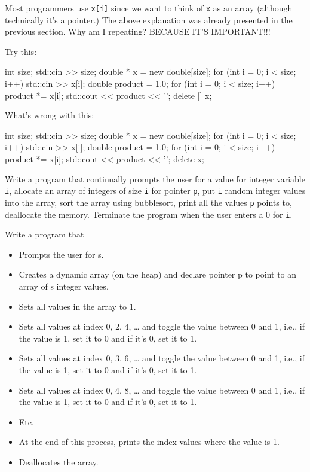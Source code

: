 Most programmers use \texttt{x[i]} since we want to think of \texttt{x}
as an array (although technically it's a pointer.) The
above explanation was already presented in the previous section. Why am
I repeating? BECAUSE IT'S IMPORTANT!!!

Try this:

\begin{consolethree}[escapeinside=||]
int size;
std::cin >> size;
double * x = new double[size];
for (int i = 0; i < size; i++)
{
    std::cin >> x[i];
}
double product = 1.0;
for (int i = 0; i < size; i++)
{
    product *= x[i];
    std::cout << product << '\n';
}
delete [] x;
\end{consolethree}

\begin{ex}
What's wrong with this:

\begin{consolethree}[escapeinside=||]
int size;
std::cin >> size;
double * x = new double[size];
for (int i = 0; i < size; i++)
{
    std::cin >> x[i];
}
double product = 1.0;
for (int i = 0; i < size; i++)
{
    product *= x[i];
    std::cout << product << '\n';
}
delete x;
\end{consolethree}
\end{ex}

\begin{ex}
Write a program that continually prompts the user for
a value for integer variable \texttt{i}, allocate an array of integers of
size \texttt{i} for pointer \texttt{p}, put \texttt{i} random integer values
into the array, sort the array using bubblesort, print all the values
\texttt{p} points to, deallocate the memory. Terminate the program when
the user enters a 0 for \texttt{i}.
\end{ex}

\begin{ex}
Write a program that

\begin{itemize}
\item Prompts the user for s.
\item Creates a dynamic array (on the heap) and declare pointer p to point
  to an array of s integer values.
\item Sets all values in the array to 1.
\item Sets all values at index 0, 2, 4, \ldots{} and toggle the value
  between 0 and 1, i.e., if the value is 1, set it to 0 and if it's 0,
  set it to 1.
\item Sets all values at index 0, 3, 6, \ldots{} and toggle the value
  between 0 and 1, i.e., if the value is 1, set it to 0 and if it's 0,
  set it to 1.
\item Sets all values at index 0, 4, 8, \ldots{} and toggle the value
  between 0 and 1, i.e., if the value is 1, set it to 0 and if it's 0,
  set it to 1.
\item Etc.
\item At the end of this process, prints the index values where the value is
  1.
\item Deallocates the array.
\end{itemize}
\end{ex}


